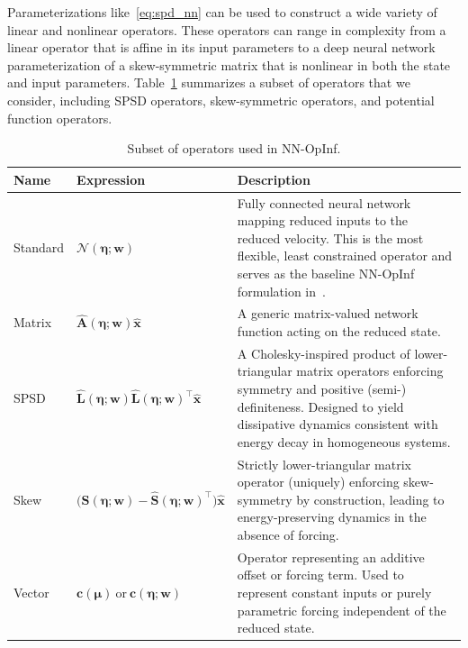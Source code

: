 \documentclass[3p,computermodern,11pt]{elsarticle}
\numberwithin{equation}{section}
\newcommand{\reducedState}{\hat{\state}}
\newcommand{\networkInputs}{\boldsymbol \eta}
\newcommand{\reducedStiffnessMatrixNN}{\hat{\boldsymbol A}}
\newcommand{\reducedSpdMatrixLowerNN}{\hat{\boldsymbol L}}
\newcommand{\reducedSkewMatrixLowerNN}{\hat{\boldsymbol S}}
\newcommand{\weights}{\mathbf{w}}
\newcommand{\state}{\boldsymbol x}
\newcommand{\params}{\boldsymbol \mu}
\begin{document}
Parameterizations like~\eqref{eq:spd_nn} can be used to construct a wide variety of linear and nonlinear operators. These operators can range in complexity from a linear operator that is affine in its input parameters to a deep neural network parameterization of a skew-symmetric matrix that is nonlinear in both the state and input parameters. Table~\ref{tab:operators} summarizes a subset of operators that we consider, including SPSD operators, skew-symmetric operators, and potential function operators.
\begin{table}[t]
    \centering
    \small
    \caption{Subset of operators used in NN-OpInf. }
    \label{tab:operators}
    \begin{tabularx}{\textwidth}{@{}l l X@{}}
        \toprule
        \textbf{Name} & \textbf{Expression} & \textbf{Description} \\
        \midrule
        Standard  &
        $\mathcal{N}(\networkInputs;\weights)$ &
        Fully connected neural network mapping reduced inputs to the reduced velocity. This is the most flexible, least constrained operator and serves as the baseline NN-OpInf formulation in~\cite{GaWaZh20}. \\
        Matrix &
        $\reducedStiffnessMatrixNN(\networkInputs;\weights)\reducedState$ &
        A generic 
        matrix-valued network function acting on the reduced state. \\
        SPSD &
        $\reducedSpdMatrixLowerNN(\networkInputs;\weights)\reducedSpdMatrixLowerNN(\networkInputs;\weights)^\intercal\reducedState$ &
        A Cholesky-inspired product of lower-triangular matrix operators enforcing
        symmetry and positive (semi-) definiteness. 
        Designed to yield dissipative dynamics consistent with energy decay in homogeneous systems. \\
        Skew &
        $\big(\reducedSkewMatrixLowerNN(\networkInputs;\weights)-\reducedSkewMatrixLowerNN(\networkInputs;\weights)^\intercal\big)\reducedState$ &
        Strictly lower-triangular matrix operator (uniquely) enforcing skew-symmetry by construction, leading to energy-preserving dynamics in the absence of forcing. \\
        Vector &
        $\mathbf{c}(\params)\ \text{or}\ \mathbf{c}(\networkInputs;\weights)$ &
        Operator representing an additive offset or forcing term. Used to represent constant inputs or purely parametric forcing independent of the reduced state. \\

\end{tabularx}
\end{table}
\end{document}

